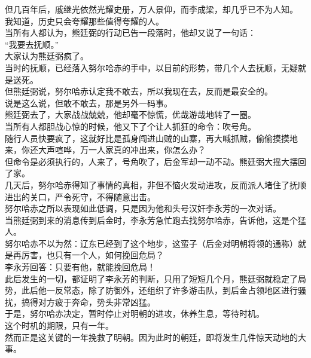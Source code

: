 \begin{multicols}{\theparacolNo}
但几百年后，戚继光依然光耀史册，万人景仰，而李成梁，却几乎已不为人知。\\

我知道，历史只会夸耀那些值得夸耀的人。\\

当所有人都认为，熊廷弼的行动已告一段落时，他却又说了一句话：\\

“我要去抚顺。”\\

大家认为熊廷弼疯了。\\

当时的抚顺，已经落入努尔哈赤的手中，以目前的形势，带几个人去抚顺，无疑就是送死。\\

但熊廷弼说，努尔哈赤认定我不敢去，所以我现在去，反而是最安全的。\\

说是这么说，但敢不敢去，那是另外一码事。\\

熊廷弼去了，大家战战兢兢，他却毫不惊慌，优哉游哉地转了一圈。\\

当所有人都胆战心惊的时候，他又下了个让人抓狂的命令：吹号角。\\

随行人员快要疯了，这就好比是孤身闯进山贼的山寨，再大喊抓贼，偷偷摸摸地来，你还大声喧哗，万一人家真的冲出来，你怎么办？\\

但命令是必须执行的，人来了，号角吹了，后金军却一动不动。熊廷弼大摇大摆回了家。\\

几天后，努尔哈赤得知了事情的真相，非但不恼火发动进攻，反而派人堵住了抚顺进出的关口，严令死守，不得随意出击。\\

努尔哈赤之所以表现如此低调，只是因为他和头号汉奸李永芳的一次对话。\\

当熊廷弼到来的消息传到后金时，李永芳急忙跑去找努尔哈赤，告诉他，这是个猛人。\\

努尔哈赤不以为然：辽东已经到了这个地步，这蛮子（后金对明朝将领的通称）就是再厉害，也只有一个人，如何挽回危局？\\

李永芳回答：只要有他，就能挽回危局！\\

此后发生的一切，都证明了李永芳的判断，只用了短短几个月，熊廷弼就稳定了局势，此后他一反常态，除了防御外，还组织了许多游击队，到后金占领地区进行骚扰，搞得对方疲于奔命，势头非常凶猛。\\

于是，努尔哈赤决定，暂时停止对明朝的进攻，休养生息，等待时机。\\

这个时机的期限，只有一年。\\

然而正是这关键的一年挽救了明朝。因为此时的朝廷，即将发生几件惊天动地的大事。\\
\ifnum{}
	\end{multicols}
\fi
\newpage
